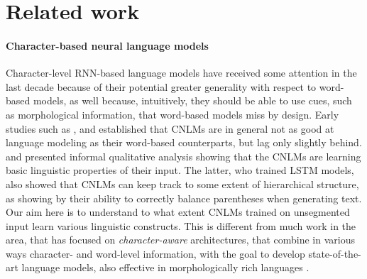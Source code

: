 \section{Related work}
\label{sec:related}

\paragraph{Character-based neural language models} Character-level
RNN-based language models have received some attention in the last
decade because of their potential greater generality with respect to
word-based models, as well because, intuitively, they should be able
to use cues, such as morphological information, that word-based models
miss by design. Early studies such as ,
 and  established
that CNLMs are in general not as good at language modeling as their
word-based counterparts, but lag only slightly
behind.  and 
presented informal qualitative analysis showing that the CNLMs are
learning basic linguistic properties of their input. The latter, who
trained LSTM models, also showed that CNLMs can keep track to some
extent of hierarchical structure, as showing by their ability to
correctly balance parentheses when generating text. Our aim here is to
understand to what extent CNLMs trained on unsegmented input learn
various linguistic constructs. This is different from much work in the
area, that has focused on \emph{character-aware} architectures, that
combine in various ways character- and word-level information, with
the goal to develop state-of-the-art language models, also effective
in morphologically rich languages \citep[see, e.g.,][and references
there]{Bojanowski:etal:2016,Kim:etal:2016,Gerz:etal:2018}.


